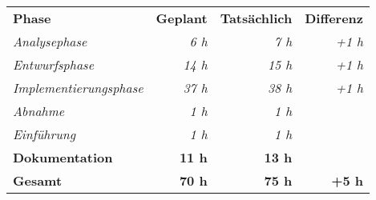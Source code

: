\begin{tabular}{lrrr}
\rowcolor{heading}\textbf{Phase} & \textbf{Geplant}  & \textbf{Tatsächlich}  & \textbf{Differenz}  \\
\rowcolor{heading}\textit{Analysephase} & \textit{6 h} & \textit{7 h} & \textit{+1 h} \\
\rowcolor{heading}\textit{Entwurfsphase} & \textit{14 h} & \textit{15 h} & \textit{+1 h} \\
\rowcolor{heading}\textit{Implementierungsphase} & \textit{37 h} & \textit{38 h} & \textit{+1 h} \\
\rowcolor{heading}\textit{Abnahme} & \textit{1 h} & \textit{1 h} & \textit{} \\
\rowcolor{heading}\textit{Einführung} & \textit{1 h} & \textit{1 h} & \textit{} \\
\rowcolor{heading}\textbf{Dokumentation} & \textbf{11 h} & \textbf{13 h} & \textbf{} \\
\hline
\hline
\rowcolor{heading}\textbf{Gesamt} & \textbf{70 h} & \textbf{75 h} & \textbf{+5 h} \\
\end{tabular}

